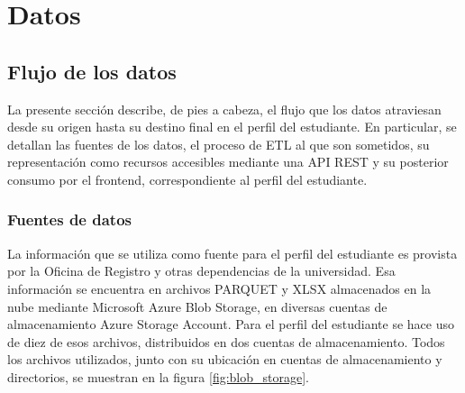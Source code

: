 \chapter{Datos}

\section{Flujo de los datos}

La presente sección describe, de pies a cabeza, el flujo que los datos atraviesan desde su origen hasta su destino final en el perfil del estudiante. En particular, se detallan las fuentes de los datos, el proceso de \gls{ETL} al que son sometidos, su representación como recursos accesibles mediante una \gls{API REST} y su posterior consumo por el frontend, correspondiente al perfil del estudiante.

\subsection{Fuentes de datos}

La información que se utiliza como fuente para el perfil del estudiante es provista por la Oficina de Registro y otras dependencias de la universidad. %
Esa información se encuentra en archivos PARQUET y XLSX almacenados en la nube mediante Microsoft Azure Blob Storage, en diversas cuentas de almacenamiento Azure Storage Account. Para el perfil del estudiante se hace uso de diez de esos archivos, distribuidos en dos cuentas de almacenamiento. Todos los archivos utilizados, junto con su ubicación en cuentas de almacenamiento y directorios, se muestran en la figura \ref{fig:blob_storage}. 

